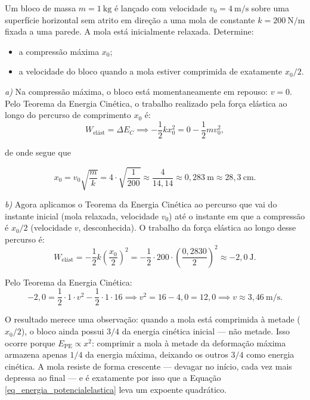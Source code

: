 \begin{exemplo}\label{exemplo_energia_potencialelasticaex03}

Um bloco de massa $m = 1\ \text{kg}$ é lançado com velocidade $v_0 = 4\ \text{m/s}$
sobre uma superfície horizontal sem atrito em direção a uma mola de constante
$k = 200\ \text{N/m}$ fixada a uma parede. A mola está inicialmente relaxada. Determine: 

\begin{itemize}
    \item [a)] a compressão máxima $x_0$;

    \item [b)] a velocidade do bloco quando a mola estiver comprimida de exatamente $x_0/2$.
\end{itemize}

\resolucao

\textit{a)} Na compressão máxima, o bloco está momentaneamente em repouso: $v = 0$.
Pelo Teorema da Energia Cinética, o trabalho realizado pela força elástica ao longo
do percurso de comprimento $x_0$ é:
%
\begin{equation*}
    W_{\text{elást}} = \Delta E_C \implies
    -\frac{1}{2}kx_0^2 = 0 - \frac{1}{2}mv_0^2,
\end{equation*}

\noindent de onde segue que

$$ x_0 = v_0\sqrt{\frac{m}{k}} = 4 \cdot \sqrt{\frac{1}{200}}
    \approx \frac{4}{14{,}14} \approx 0{,}283\ \text{m} \approx 28{,}3\ \text{cm}.$$

\textit{b)} Agora aplicamos o Teorema da Energia Cinética ao percurso que vai do
instante inicial (mola relaxada, velocidade $v_0$) até o instante em que a compressão
é $x_0/2$ (velocidade $v$, desconhecida). O trabalho da força elástica ao longo desse
percurso é:
%
\begin{equation*}
    W_{\text{elást}} = -\frac{1}{2}k\left(\frac{x_0}{2}\right)^2
    = -\frac{1}{2} \cdot 200 \cdot \left(\dfrac{0,2830}{2} \right)^2 \approx -2{,}0\ \text{J}.
\end{equation*}

Pelo Teorema da Energia Cinética:
%
\begin{equation*}
    -2{,}0 = \frac{1}{2} \cdot 1 \cdot v^2 - \frac{1}{2} \cdot 1 \cdot 16
    \implies v^2 = 16 - 4{,}0 = 12{,}0
    \implies v \approx 3{,}46\ \text{m/s}.
\end{equation*}

O resultado merece uma observação: quando a mola está comprimida à metade ($x_0/2$),
o bloco ainda possui $3/4$ da energia cinética inicial --- não metade. Isso ocorre
porque $E_\text{PE} \propto x^2$: comprimir a mola à metade da deformação máxima armazena
apenas $1/4$ da energia máxima, deixando os outros $3/4$ como energia cinética. A
mola resiste de forma crescente --- devagar no início, cada vez mais depressa ao
final ---  e é exatamente por isso que a Equação \eqref{eq_energia_potencialelastica} leva um expoente quadrático.
\end{exemplo}
